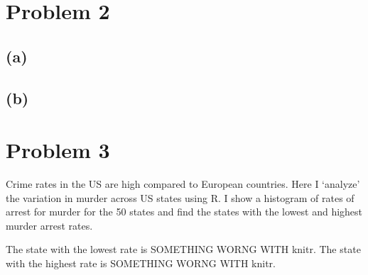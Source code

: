 \documentclass{article}
\newcommand{\rinline}[1]{SOMETHING WORNG WITH knitr}
\begin{document}



\newpage

\section*{Problem 2}
\subsection*{(a)}

\subsection*{(b)}

\newpage

\section*{Problem 3}

Crime rates in the US are high compared to European countries. Here I `analyze' the variation in murder across US states using R. I show a histogram of rates of arrest for murder for the 50 states and find the states with the lowest and highest murder arrest rates.



The state with the lowest rate is \rinline{attributes(USArrests)$row.names[which.min(USArrests$Murder)]}. The state with the highest rate is \rinline{attributes(USArrests)$row.names[which.max(USArrests$Murder)]}.
\end{document}
